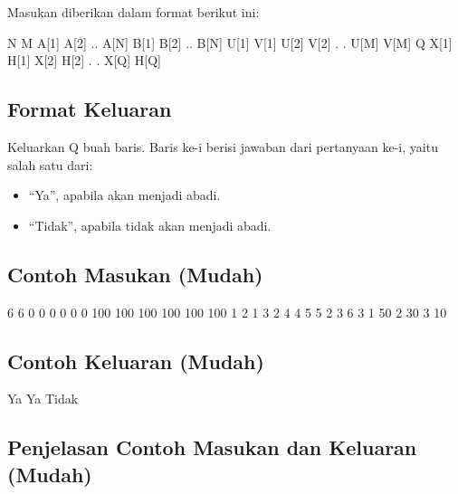 \documentclass[../main_problemset.tex]{subfiles} %
\begin{document}
Masukan diberikan dalam format berikut ini:

\begin{lcverbatim}
N M
A[1] A[2] .. A[N]
B[1] B[2] .. B[N]
U[1] V[1]
U[2] V[2]
.
.
U[M] V[M]
Q
X[1] H[1]
X[2] H[2]
.
.
X[Q] H[Q]
\end{lcverbatim}

\subsection*{Format Keluaran}

Keluarkan Q buah baris. Baris ke-i berisi jawaban dari pertanyaan ke-i, yaitu salah satu dari:

\begin{itemize}
	\item ``Ya'', apabila akan menjadi abadi.
	\item ``Tidak'', apabila tidak akan menjadi abadi.
\end{itemize}

\vspace{.4cm}

\begin{minipage}[t]{0.5\textwidth}
\subsection*{Contoh Masukan (Mudah)}

\begin{lcverbatim}
6 6
0 0 0 0 0 0
100 100 100 100 100 100
1 2
1 3
2 4
4 5
5 2
3 6
3
1 50
2 30
3 10
\end{lcverbatim}
\end{minipage}
\begin{minipage}[t]{0.5\textwidth}
\subsection*{Contoh Keluaran (Mudah)}

\begin{lcverbatim}
Ya
Ya
Tidak
\end{lcverbatim}
\end{minipage}

\subsection*{Penjelasan Contoh Masukan dan Keluaran (Mudah)}
\end{document}
